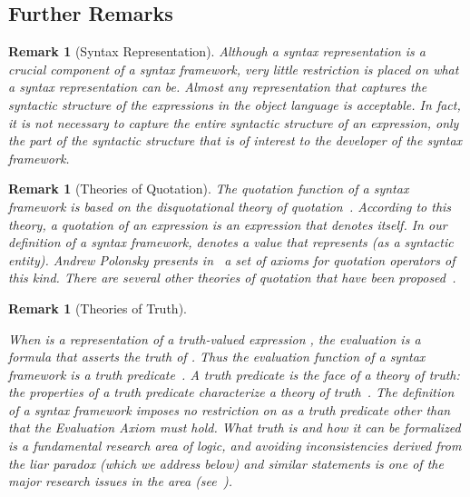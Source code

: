 \documentclass[11pt,fleqn]{article}
\newcommand{\bsp}{\begin{sloppypar}}
\newcommand{\esp}{\end{sloppypar}}
\newtheorem{rem}[thm]{Remark}
\begin{document}
\subsection{Further Remarks}

\begin{rem}[Syntax Representation]\em
Although a syntax representation is a crucial component of a syntax
framework, very little restriction is placed on what a syntax
representation can be.  Almost any representation that captures the
syntactic structure of the expressions in the object language is
acceptable.  In fact, it is not necessary to capture the entire
syntactic structure of an expression, only the part of the syntactic
structure that is of interest to the developer of the syntax
framework.\hfill 
\end{rem}

\begin{rem}[Theories of Quotation]\em
The quotation function  of a syntax framework is based on the
\emph{disquotational theory of quotation}~\cite{Quotation12}.
According to this theory, a quotation of an expression  is an
expression that denotes  itself.  In our definition of a syntax
framework,  denotes a value that represents  (as a syntactic
entity).  Andrew Polonsky presents in~\cite{Polonsky11} a set of
axioms for quotation operators of this kind.  There are several other
theories of quotation that have been
proposed~\cite{Quotation12}.\hfill 
\end{rem}

\begin{rem}[Theories of Truth]\em\bsp
When  is a representation of a truth-valued expression , the
evaluation  is a formula that asserts the truth of .  Thus
the evaluation function  of a syntax framework is a \emph{truth
  predicate}~\cite{Truth13}.  A truth predicate is the face of a
\emph{theory of truth}: the properties of a truth predicate
characterize a theory of truth~\cite{Leitgeb07}.  The definition of a
syntax framework imposes no restriction on  as a truth predicate
other than that the Evaluation Axiom must hold.  What truth is and how
it can be formalized is a fundamental research area of logic, and
avoiding inconsistencies derived from the liar paradox (which we
address below) and similar statements is one of the major research
issues in the area (see~\cite{Halbach11}).\hfill \esp
\end{rem}
\end{document}

